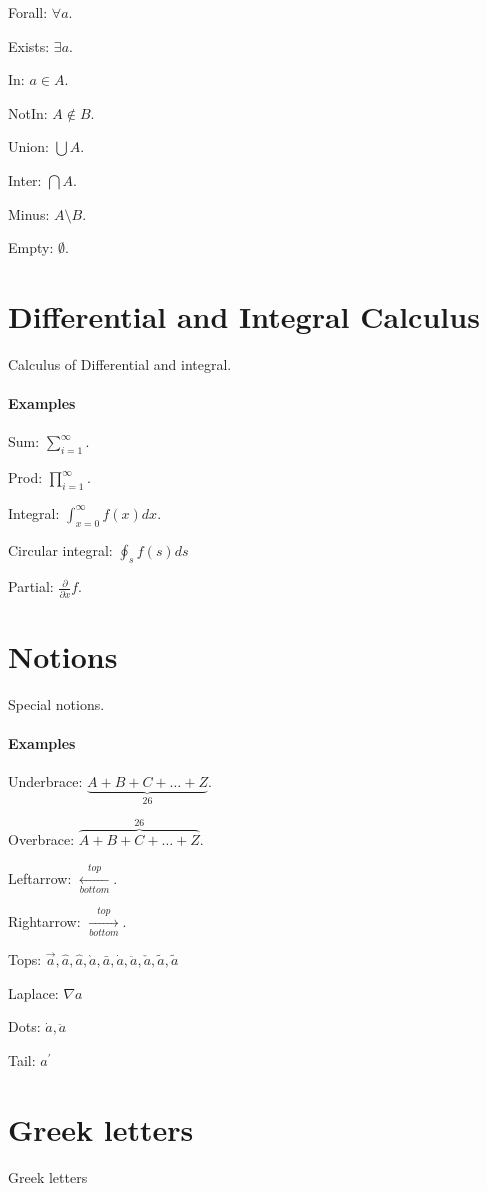 \documentclass{article}[20200304]
\begin{document}
Forall: \(\forall a\).

Exists: \(\exists a\).

In: \(a \in A\).

NotIn: \(A \notin B\).

Union: \(\bigcup A\).

Inter: \(\bigcap A\).

Minus: \(A \setminus B\).

Empty: \(\emptyset\).

\section{Differential and Integral Calculus}
Calculus of Differential and integral.

\paragraph{Examples}

Sum: \(\sum\limits_{i=1}^{\infty}\).

Prod: \(\prod\limits_{i=1}^{\infty}\).

Integral: \(\int_{x=0}^{\infty} f(x) d{x}\).

Circular integral: \(\oint_{s} f(s) d{s}\)

Partial: \(\frac{\partial}{\partial x} f\).

\section{Notions}
Special notions.

\paragraph{Examples}

Underbrace: \(\underbrace{A+B+C+ \dots +Z}_{\text{26}}\).

Overbrace: \(\overbrace{A+B+C+ \dots +Z}^{\text{26}}\).

Leftarrow: \(\xleftarrow[bottom]{top}\).

Rightarrow: \(\xrightarrow[bottom]{top}\).

Tops: \(\vec{a}, \hat{a}, \widehat{a}, \grave{a}, \bar{a}, \dot{a}, \ddot{a}, \check{a}, \tilde{a}, \widetilde{a}\)

Laplace: \(\nabla a\)

Dots: \(\dot{a}, \ddot{a}\)

Tail: \(a^{'}\)

\section{Greek letters}
Greek letters
\end{document}
